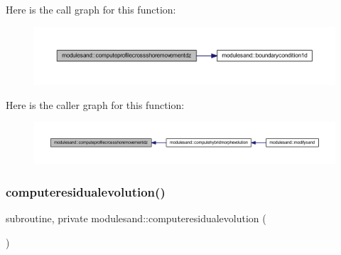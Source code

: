 Here is the call graph for this function\+:\nopagebreak
\begin{figure}[H]
\begin{center}
\leavevmode
\includegraphics[width=350pt]{namespacemodulesand_a5316ef806da7d9e5bca8d121c7f5fa28_cgraph}
\end{center}
\end{figure}
Here is the caller graph for this function\+:\nopagebreak
\begin{figure}[H]
\begin{center}
\leavevmode
\includegraphics[width=350pt]{namespacemodulesand_a5316ef806da7d9e5bca8d121c7f5fa28_icgraph}
\end{center}
\end{figure}
\mbox{\label{namespacemodulesand_a4577ec7b0d16f959a488db5280c61154}} 
\subsubsection{\texorpdfstring{computeresidualevolution()}{computeresidualevolution()}}
{\footnotesize\ttfamily subroutine, private modulesand\+::computeresidualevolution (\begin{DoxyParamCaption}{ }\end{DoxyParamCaption})\hspace{0.3cm}{\ttfamily [private]}}

